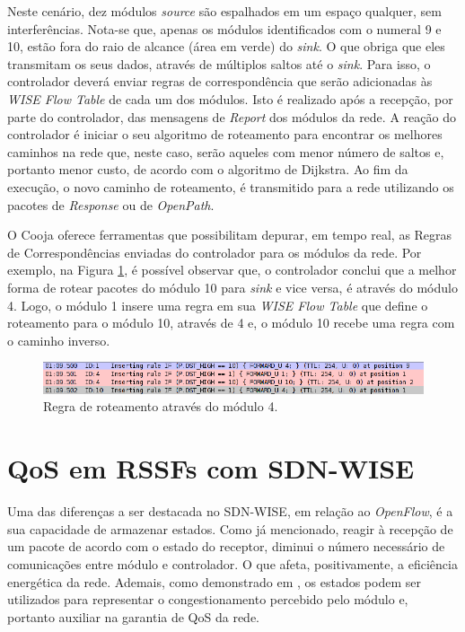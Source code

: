 Neste cenário, dez módulos \textit{source} são espalhados em um espaço qualquer, sem interferências. Nota-se que, apenas os módulos identificados com o numeral 9 e 10, estão fora do raio de alcance (área em verde) do \textit{sink}. O que obriga que eles transmitam os seus dados, através de múltiplos saltos até o \textit{sink}. Para isso, o controlador deverá enviar regras de correspondência que serão adicionadas às \textit{WISE Flow Table} de cada um dos módulos. Isto é realizado após a recepção, por parte do controlador, das mensagens de \textit{Report} dos módulos da rede. A reação do controlador é iniciar o seu algoritmo de roteamento para encontrar os melhores caminhos na rede que, neste caso, serão aqueles com menor número de saltos e, portanto menor custo, de acordo com o algoritmo de Dijkstra. Ao fim da execução, o novo caminho de roteamento, é transmitido para a rede utilizando os pacotes de \textit{Response} ou de \textit{OpenPath}.

O Cooja oferece ferramentas que possibilitam depurar, em tempo real, as Regras de Correspondências enviadas  do controlador para os módulos da rede. Por exemplo, na Figura \ref{DescobertaDeCaminhoExemploa}, é possível observar que, o controlador conclui que a melhor forma de rotear pacotes do módulo 10 para \textit{sink} e vice versa, é através do módulo 4. Logo, o módulo 1 insere uma regra em sua \textit{WISE Flow Table} que define o roteamento para o módulo 10, através de 4 e, o módulo 10 recebe uma regra com o caminho inverso.

\begin{figure}[!htb]
    \centering
    \includegraphics[width=15cm]{figs/regrasDeRoteamentoAtravesDe4.png}
    \caption{Regra de roteamento através do módulo 4.}
    \label{DescobertaDeCaminhoExemploa}
\end{figure}



\section{\ac{QoS} em \ac{RSSF}s com \ac{SDN-WISE}}
\label{s_c2_wise_sdn_QOS}

Uma das diferenças a ser destacada no \ac{SDN-WISE}, em relação ao \textit{OpenFlow}, é a sua capacidade de armazenar estados. Como já mencionado, reagir à recepção de um pacote de acordo com o estado do receptor, diminui o número necessário de comunicações entre módulo e controlador. O que afeta, positivamente, a eficiência energética da rede. Ademais, como demonstrado em , os estados podem ser utilizados para representar o congestionamento percebido pelo módulo e, portanto auxiliar na garantia de \ac{QoS} da rede. 

